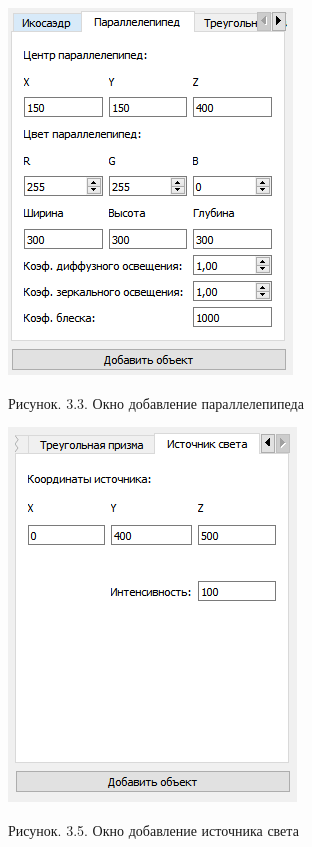 \documentclass[12pt]{report}
\begin{document}
		\begin{minipage}{0.5\textwidth}
		\begin{center}
			\includegraphics[scale=0.8]{paral.png}
			
			Рисунок. 3.3. Окно добавление параллелепипеда
		\end{center}
	\end{minipage}
	\hfill
	\begin{minipage}{0.5\textwidth}
		\begin{center}
			\includegraphics[scale=0.8]{lt.png}
			
			Рисунок. 3.5. Окно добавление источника света
		\end{center}
	\end{minipage}
\end{document}
